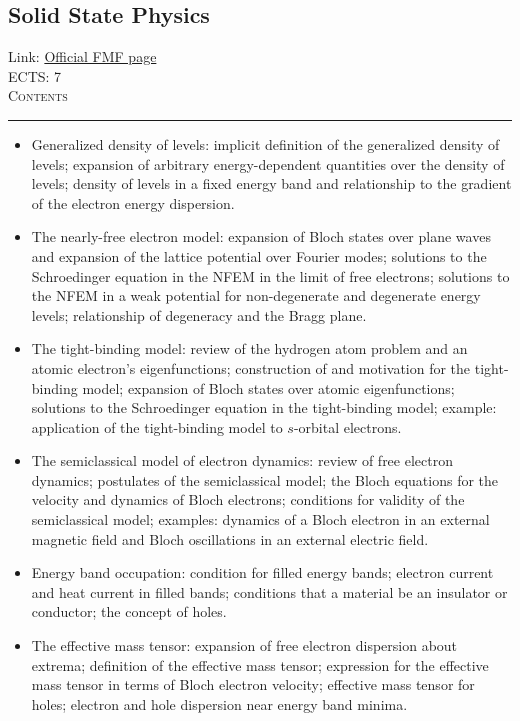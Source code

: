 \documentclass[11pt, a4paper]{article}
\newenvironment{course}[3]{
\subsection{#1}%
Link: \href{#2}{Official FMF page}\\%
ECTS: #3%
\vspace{1ex}
\\
{\large \textsc{Contents}}\\[-0.9ex]%
\rule{\textwidth}{0.5pt}
\vspace{-3ex}
}
{}
\newenvironment{chapter}[1]{
\begin{tcolorbox}[title=#1, breakable]
}
{\end{tcolorbox}}
\begin{document}
\begin{course}{Solid State Physics}{https://www.fmf.uni-lj.si/en/study-physics/programmes/1fiz/2020/7000777/courses/1138/}{7}
\begin{chapter}{Electron states in a periodic potential}
\begin{itemize}
            \item Generalized density of levels: implicit definition of the generalized density of levels; expansion of arbitrary energy-dependent quantities over the density of levels; density of levels in a fixed energy band and relationship to the gradient of the electron energy dispersion.

            \item The nearly-free electron model: expansion of Bloch states over plane waves and expansion of the lattice potential over Fourier modes; solutions to the Schroedinger equation in the NFEM in the limit of free electrons; solutions to the NFEM in a weak potential for non-degenerate and degenerate energy levels; relationship of degeneracy and the Bragg plane.

            \item The tight-binding model: review of the hydrogen atom problem and an atomic electron's eigenfunctions; construction of and motivation for the tight-binding model; expansion of Bloch states over atomic eigenfunctions; solutions to the Schroedinger equation in the tight-binding model; example: application of the tight-binding model to $ s $-orbital electrons.

            \item The semiclassical model of electron dynamics: review of free electron dynamics; postulates of the semiclassical model; the Bloch equations for the velocity and dynamics of Bloch electrons; conditions for validity of the semiclassical model; examples: dynamics of a Bloch electron in an external magnetic field and Bloch oscillations in an external electric field.

            \item Energy band occupation: condition for filled energy bands; electron current and heat current in filled bands; conditions that a material be an insulator or conductor; the concept of holes.

            \item The effective mass tensor: expansion of free electron dispersion about extrema; definition of the effective mass tensor; expression for the effective mass tensor in terms of Bloch electron velocity; effective mass tensor for holes; electron and hole dispersion near energy band minima.
        
        \end{itemize}
    \end{chapter}

    \begin{chapter}{Semiconductor physics}
        \begin{itemize}
        

\end{itemize}
\end{chapter}
\end{course}
\end{document}

